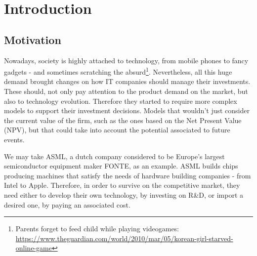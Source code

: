 
\chapter{Introduction}
\label{chapter:introduction}


\section{Motivation}
\label{section:motivation}

Nowadays, society is highly attached to technology, from mobile phones to fancy gadgets - and sometimes scratching the absurd\footnote{Parents forget to feed child while playing videogames:\\
\url{https://www.theguardian.com/world/2010/mar/05/korean-girl-starved-online-game} }.
 Nevertheless, all this huge demand brought changes on how IT companies should manage their investments. These should, not only pay attention to the product demand on the market, but also to technology evolution. Therefore they started to require more complex models to support their investment decisions. Models that wouldn't just consider the current value of the firm, such as the ones based on the Net Present Value (NPV), but that could take into account the potential associated to future events.

We may take ASML, a dutch company considered to be Europe's largest semiconductor equipment maker FONTE, as an example.
ASML builds chips producing machines that satisfy the needs of hardware building companies - from Intel to Apple.
Therefore, in order to survive on the competitive market, they need either to develop their own technology, by investing on R\&D, or import a desired one, by paying an associated cost.

